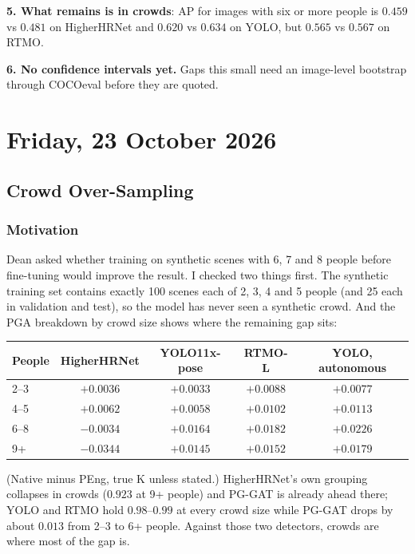 \textbf{5. What remains is in crowds}: AP for images with six or more people is $0.459$ vs $0.481$ on HigherHRNet and $0.620$ vs $0.634$ on YOLO, but $0.565$ vs $0.567$ on RTMO.

\textbf{6. No confidence intervals yet.} Gaps this small need an image-level bootstrap through COCOeval before they are quoted.

\section[2026/10/23]{Friday, 23 October 2026}

\subsection{Crowd Over-Sampling}

\subsubsection{Motivation}

Dean asked whether training on synthetic scenes with 6, 7 and 8 people before fine-tuning would improve the result. I checked two things first. The synthetic training set contains exactly 100 scenes each of 2, 3, 4 and 5 people (and 25 each in validation and test), so the model has never seen a synthetic crowd. And the PGA breakdown by crowd size shows where the remaining gap sits:

\begin{tabular}{lcccc}
\hline
\textbf{People} & \textbf{HigherHRNet} & \textbf{YOLO11x-pose} & \textbf{RTMO-L} & \textbf{YOLO, autonomous} \\
\hline
2--3   & $+0.0036$ & $+0.0033$ & $+0.0088$ & $+0.0077$ \\
4--5   & $+0.0062$ & $+0.0058$ & $+0.0102$ & $+0.0113$ \\
6--8   & $-0.0034$ & $+0.0164$ & $+0.0182$ & $+0.0226$ \\
9+     & $-0.0344$ & $+0.0145$ & $+0.0152$ & $+0.0179$ \\
\hline
\end{tabular}

\vspace{0.5em}

(Native minus PEng, true K unless stated.) HigherHRNet's own grouping collapses in crowds ($0.923$ at 9+ people) and PG-GAT is already ahead there; YOLO and RTMO hold $0.98$--$0.99$ at every crowd size while PG-GAT drops by about $0.013$ from 2--3 to 6+ people. Against those two detectors, crowds are where most of the gap is.

